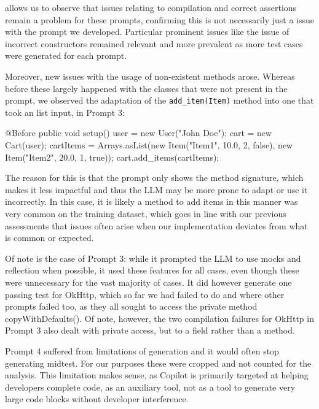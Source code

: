 
 allows us to observe that issues relating to compilation and correct assertions remain
a problem for these prompts, confirming this is not necessarily just a issue with the prompt we developed.
%
Particular prominent issues like the issue of incorrect constructors %
remained relevant
and more prevalent as more test cases were generated for each prompt.

Moreover, new issues with the usage of non-existent methods arose. Whereas before these largely happened with the classes that were not present
in the prompt, we observed the adaptation of the \texttt{add\_item(Item)} method into one that took an list input, in Prompt 3:
\begin{response}
    @Before
    public void setup() {
        user = new User("John Doe");
        cart = new Cart(user);
        cartItems = Arrays.asList(new Item("Item1", 10.0, 2, false),
                                  new Item("Item2", 20.0, 1, true));
        cart.add_items(cartItems);
    }
\end{response}
The reason for this is that the prompt only shows the method signature, which makes it less impactful and thus the LLM may be
more prone to adapt or use it incorrectly. In this case, it is likely a method to add items in this manner was very common on the training dataset,
which goes in line with our previous assessments that issues often arise when our implementation deviates from what is common or expected.

Of note is the case of Prompt 3: while it prompted the LLM to use mocks and reflection when possible, it used these features
for all cases, even though these were unnecessary for the vast majority of cases. It did however generate one passing test for OkHttp,
which so far we had failed to do and where other prompts failed too, as they all sought to access the private method copyWithDefaults().
Of note, however, the two compilation failures for OkHttp in Prompt 3 also dealt with private access, but to a field rather than a method.

Prompt 4 suffered from limitations of generation and it would often stop generating midtest. For our purposes these were cropped and not counted for the analysis.
This limitation makes sense, as Copilot is primarily targeted at helping developers complete code, as an auxiliary tool, not as a tool to generate very large
code blocks without developer interference.


